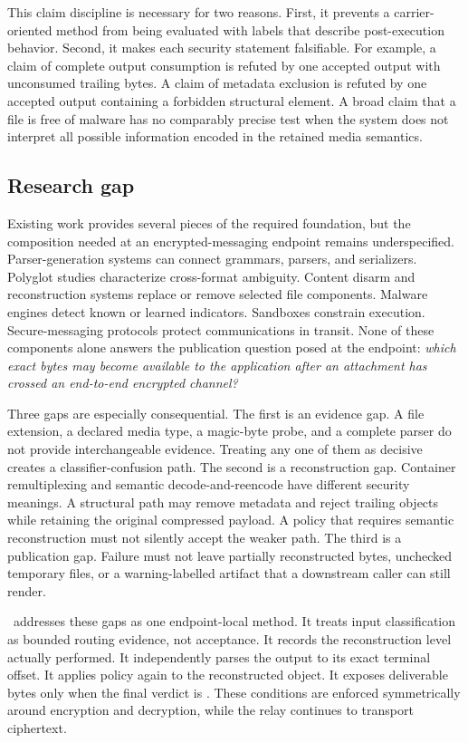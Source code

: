 This claim discipline is necessary for two reasons. First, it prevents a
carrier-oriented method from being evaluated with labels that describe
post-execution behavior. Second, it makes each security statement falsifiable.
For example, a claim of complete output consumption is refuted by one accepted
output with unconsumed trailing bytes. A claim of metadata exclusion is refuted
by one accepted output containing a forbidden structural element. A broad
claim that a file is free of malware has no comparably precise test when the
system does not interpret all possible information encoded in the retained
media semantics.

\subsection{Research gap}

Existing work provides several pieces of the required foundation, but the
composition needed at an encrypted-messaging endpoint remains underspecified.
Parser-generation systems can connect grammars, parsers, and serializers.
Polyglot studies characterize cross-format ambiguity. Content disarm and
reconstruction systems replace or remove selected file components. Malware
engines detect known or learned indicators. Sandboxes constrain execution.
Secure-messaging protocols protect communications in transit. None of these
components alone answers the publication question posed at the endpoint:
\emph{which exact bytes may become available to the application after an
attachment has crossed an end-to-end encrypted channel?}

Three gaps are especially consequential. The first is an evidence gap. A file
extension, a declared media type, a magic-byte probe, and a complete parser do
not provide interchangeable evidence. Treating any one of them as decisive
creates a classifier-confusion path. The second is a reconstruction gap.
Container remultiplexing and semantic decode-and-reencode have different
security meanings. A structural path may remove metadata and reject trailing
objects while retaining the original compressed payload. A policy that requires
semantic reconstruction must not silently accept the weaker path. The third is
a publication gap. Failure must not leave partially reconstructed bytes,
unchecked temporary files, or a warning-labelled artifact that a downstream
caller can still render.

\AFD\ addresses these gaps as one endpoint-local method. It treats input
classification as bounded routing evidence, not acceptance. It records the
reconstruction level actually performed. It independently parses the output to
its exact terminal offset. It applies policy again to the reconstructed object.
It exposes deliverable bytes only when the final verdict is \Clean. These
conditions are enforced symmetrically around encryption and decryption, while
the relay continues to transport ciphertext.

